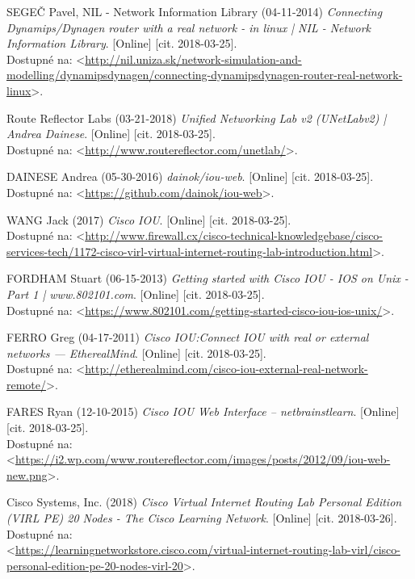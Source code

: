 \begin{thebibliography}{99}
SEGEČ Pavel, NIL - Network Information Library (04-11-2014) {\it Connecting Dynamips/Dynagen router with a real network - in linux | NIL - Network Information Library}. [Online] [cit. 2018-03-25]. \\ 
Dostupné na: <\url{http://nil.uniza.sk/network-simulation-and-modelling/dynamipsdynagen/connecting-dynamipsdynagen-router-real-network-linux}>.

Route Reflector Labs (03-21-2018) {\it Unified Networking Lab v2 (UNetLabv2) | Andrea Dainese}. [Online] [cit. 2018-03-25]. \\
Dostupné na: <\url{http://www.routereflector.com/unetlab/}>.

DAINESE Andrea (05-30-2016) {\it dainok/iou-web}. [Online] [cit. 2018-03-25]. \\
Dostupné na: <\url{https://github.com/dainok/iou-web}>.

WANG Jack (2017) {\it Cisco IOU}. [Online] [cit. 2018-03-25]. \\
Dostupné na: <\url{http://www.firewall.cx/cisco-technical-knowledgebase/cisco-services-tech/1172-cisco-virl-virtual-internet-routing-lab-introduction.html}>.

FORDHAM Stuart (06-15-2013) {\it Getting started with Cisco IOU - IOS on Unix - Part 1 | www.802101.com}. [Online] [cit. 2018-03-25]. \\
Dostupné na: <\url{https://www.802101.com/getting-started-cisco-iou-ios-unix/}>.

FERRO Greg (04-17-2011) {\it Cisco IOU:Connect IOU with real or external networks — EtherealMind}. [Online] [cit. 2018-03-25]. \\
Dostupné na: <\url{http://etherealmind.com/cisco-iou-external-real-network-remote/}>.

FARES Ryan (12-10-2015) {\it Cisco IOU Web Interface – netbrainstlearn}. [Online] [cit. 2018-03-25]. \\
Dostupné na: \\
<\url{https://i2.wp.com/www.routereflector.com/images/posts/2012/09/iou-web-new.png}>.

Cisco Systems, Inc. (2018) {\it Cisco Virtual Internet Routing Lab Personal Edition (VIRL PE) 20 Nodes - The Cisco Learning Network}. [Online] [cit. 2018-03-26]. \\
Dostupné na: \\<\url{https://learningnetworkstore.cisco.com/virtual-internet-routing-lab-virl/cisco-personal-edition-pe-20-nodes-virl-20}>.


\end{thebibliography}
